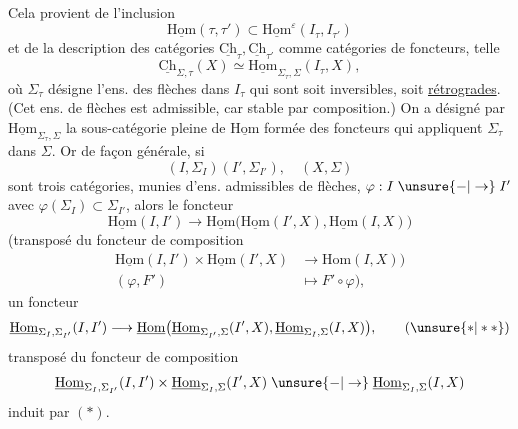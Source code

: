 
Cela provient de l'inclusion
\[
\underline{\mathrm{Hom}}(\tau,\tau')\subset\underline{\mathrm{Hom}}^{\varepsilon}(I_\tau,I_{\tau'})
\]
et de la description des catégories $\underline{\mathrm{Ch}}_\tau,\underline{\mathrm{Ch}}_{\tau'}$ comme catégories de foncteurs, telle
\[
\underline{\mathrm{Ch}}_{\Sigma,\tau}(X)\simeq\underline{\mathrm{Hom}}_{\Sigma_\tau,\Sigma}(I_\tau,X),
\]
où $\Sigma_\tau$ désigne l'ens. des flèches dans $I_\tau$ qui sont soit  inversibles, soit \uline{rétrogrades}. (Cet ens. de flèches est admissible, car stable par composition.) On a désigné par $\underline{\mathrm{Hom}}_{\Sigma_\tau,\Sigma}$ la sous-catégorie pleine de $\underline{\mathrm{Hom}}$ formée des foncteurs qui appliquent $\Sigma_\tau$ dans $\Sigma$. Or de façon générale, si
\[
(I,\Sigma_I)(I',\Sigma_{I'}),\quad(X,\Sigma)
\]
sont trois catégories, munies d'ens. admissibles de flèches,   $\varphi:I\mathrel{\unsure{-|\to}}I'$  avec $\varphi(\Sigma_I)\subset\Sigma_{I'}$, alors le foncteur  
\[
\underline{\mathrm{Hom}}(I,I')\longrightarrow\underline{\mathrm{Hom}}\bigl(\underline{\mathrm{Hom}}(I',X),\underline{\mathrm{Hom}}(I,X)\bigr)
\]
(transposé du foncteur de composition
\[
\begin{aligned}
\underline{\mathrm{Hom}}(I,I')\times\underline{\mathrm{Hom}}(I',X)&\longrightarrow\mathrm{Hom}(I,X))\\
(\varphi,F')&\longmapsto F'\circ\varphi),
\end{aligned}
\]
  un foncteur
\[
\underline{\mathrm{Hom}}_{\Sigma_I,\Sigma_{I'}}(I,I')\longrightarrow
\underline{\mathrm{Hom}}\bigl(\underline{\mathrm{Hom}}_{\Sigma_{I'},\Sigma}(I',X),\underline{\mathrm{Hom}}_{\Sigma_I,\Sigma}(I,X)\bigr),
\tag*{($\unsure{*|**}$)}
\]
transposé du foncteur de composition
\[
\underline{\mathrm{Hom}}_{\Sigma_I,\Sigma_{I'}}(I,I')\times\underline{\mathrm{Hom}}_{\Sigma_I,\Sigma}(I',X)\mathrel{\unsure{-|\to}}\underline{\mathrm{Hom}}_{\Sigma_I,\Sigma}(I,X)
\]
induit par $(*)$. 


